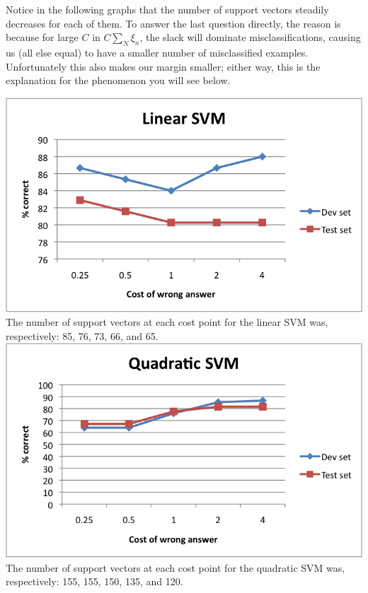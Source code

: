\documentclass[fleqn]{article}
\begin{document}
\begin{solution}
Notice in the following graphs that the number of support vectors steadily decreases for each of them. To answer the last question directly, the reason is because for large $C$ in $C \sum_N \xi_n$, the slack will dominate misclassifications, causing us (all else equal) to have a smaller number of misclassified examples. Unfortunately this also makes our margin smaller; either way, this is the explanation for the phenomenon you will see below.
\end{solution}

\includegraphics[scale=0.75]{linear.png} \\
The number of support vectors at each cost point for the linear SVM was, respectively: 85, 76, 73, 66, and 65. \\

\includegraphics[scale=0.75]{quad.png} \\
The number of support vectors at each cost point for the quadratic SVM was, respectively: 155, 155, 150, 135, and 120. \\
\end{document}
